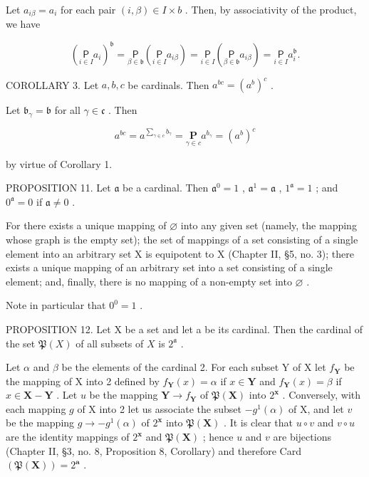 Let \(a_{i\beta} = a_i\) for each pair \((i, \beta) \in I \times b\) . Then, by associativity of the product, we have

\[
\left(\underset {i \in I} {\mathsf {P}} a _ {i}\right) ^ {\mathfrak {b}} = \underset {\beta \in \mathfrak {b}} {\mathsf {P}} \left(\underset {i \in I} {\mathsf {P}} a _ {i \beta}\right) = \underset {i \in I} {\mathsf {P}} \left(\underset {\beta \in \mathfrak {b}} {\mathsf {P}} a _ {i \beta}\right) = \underset {i \in I} {\mathsf {P}} a _ {i} ^ {\mathfrak {b}}.
\]

COROLLARY 3. Let \(a, b, c\) be cardinals. Then \(a^{bc} = (a^{b})^{c}\) .

Let \(\mathfrak{b}_{\gamma} = \mathfrak{b}\) for all \(\gamma \in \mathfrak{c}\) . Then

\[
a ^ {b c} = a ^ {\sum_ {\gamma \in c} b _ {\gamma}} = \underset {\gamma \in c} {\mathbf {P}} a ^ {b _ {\gamma}} = (a ^ {b}) ^ {c}
\]

by virtue of Corollary 1.

PROPOSITION 11. Let \(\mathfrak{a}\) be a cardinal. Then \(\mathfrak{a}^0 = 1\) , \(\mathfrak{a}^1 = \mathfrak{a}\) , \(1^{\mathfrak{a}} = 1\) ; and \(0^{\mathfrak{a}} = 0\) if \(\mathfrak{a} \neq 0\) .

For there exists a unique mapping of \(\varnothing\) into any given set (namely, the mapping whose graph is the empty set); the set of mappings of a set consisting of a single element into an arbitrary set X is equipotent to X (Chapter II, §5, no. 3); there exists a unique mapping of an arbitrary set into a set consisting of a single element; and, finally, there is no mapping of a non-empty set into \(\varnothing\) .

Note in particular that \(0^{0}=1\) .

PROPOSITION 12. Let X be a set and let a be its cardinal. Then the cardinal of the set \(\mathfrak{P}(X)\) of all subsets of \(X\) is \(2^{\mathfrak{a}}\) .

Let \(\alpha\) and \(\beta\) be the elements of the cardinal 2. For each subset Y of X let \(f_{\mathbf{Y}}\) be the mapping of X into 2 defined by \(f_{\mathbf{Y}}(x) = \alpha\) if \(x \in \mathbf{Y}\) and \(f_{\mathbf{Y}}(x) = \beta\) if \(x \in \mathbf{X} - \mathbf{Y}\) . Let \(u\) be the mapping \(\mathbf{Y} \to f_{\mathbf{Y}}\) of \(\mathfrak{P}(\mathbf{X})\) into \(2^{\mathbf{x}}\) . Conversely, with each mapping \(g\) of X into 2 let us associate the subset \(-g^{1}(\alpha)\) of X, and let \(v\) be the mapping \(g \to -g^{1}(\alpha)\) of \(2^{\mathbf{x}}\) into \(\mathfrak{P}(\mathbf{X})\) . It is clear that \(u \circ v\) and \(v \circ u\) are the identity mappings of \(2^{\mathbf{x}}\) and \(\mathfrak{P}(\mathbf{X})\) ; hence \(u\) and \(v\) are bijections (Chapter II, §3, no. 8, Proposition 8, Corollary) and therefore Card \((\mathfrak{P}(\mathbf{X})) = 2^{\mathbf{a}}\) .

